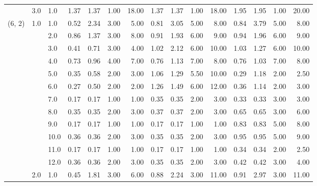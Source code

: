\begin{tabular}{lllrrrrrrrrrrrr}
       & 3.0 & 1.0  &       1.37 &      1.37 & 1.00 &  18.00 &       1.37 &      1.37 &  1.00 &  18.00 &       1.95 &      1.95 &  1.00 &  20.00 \\
(6, 2) & 1.0 & 1.0  &       0.52 &      2.34 & 3.00 &   5.00 &       0.81 &      3.05 &  5.00 &   8.00 &       0.84 &      3.79 &  5.00 &   8.00 \\
       &     & 2.0  &       0.86 &      1.37 & 3.00 &   8.00 &       0.91 &      1.93 &  6.00 &   9.00 &       0.94 &      1.96 &  6.00 &   9.00 \\
       &     & 3.0  &       0.41 &      0.71 & 3.00 &   4.00 &       1.02 &      2.12 &  6.00 &  10.00 &       1.03 &      1.27 &  6.00 &  10.00 \\
       &     & 4.0  &       0.73 &      0.96 & 4.00 &   7.00 &       0.76 &      1.13 &  7.00 &   8.00 &       0.76 &      1.03 &  7.00 &   8.00 \\
       &     & 5.0  &       0.35 &      0.58 & 2.00 &   3.00 &       1.06 &      1.29 &  5.50 &  10.00 &       0.29 &      1.18 &  2.00 &   2.50 \\
       &     & 6.0  &       0.27 &      0.50 & 2.00 &   2.00 &       1.26 &      1.49 &  6.00 &  12.00 &       0.36 &      1.14 &  2.00 &   3.00 \\
       &     & 7.0  &       0.17 &      0.17 & 1.00 &   1.00 &       0.35 &      0.35 &  2.00 &   3.00 &       0.33 &      0.33 &  3.00 &   3.00 \\
       &     & 8.0  &       0.35 &      0.35 & 2.00 &   3.00 &       0.37 &      0.37 &  2.00 &   3.00 &       0.65 &      0.65 &  3.00 &   6.00 \\
       &     & 9.0  &       0.17 &      0.17 & 1.00 &   1.00 &       0.17 &      0.17 &  1.00 &   1.00 &       0.83 &      0.83 &  5.00 &   8.00 \\
       &     & 10.0 &       0.36 &      0.36 & 2.00 &   3.00 &       0.35 &      0.35 &  2.00 &   3.00 &       0.95 &      0.95 &  5.00 &   9.00 \\
       &     & 11.0 &       0.17 &      0.17 & 1.00 &   1.00 &       0.17 &      0.17 &  1.00 &   1.00 &       0.34 &      0.34 &  2.00 &   2.50 \\
       &     & 12.0 &       0.36 &      0.36 & 2.00 &   3.00 &       0.35 &      0.35 &  2.00 &   3.00 &       0.42 &      0.42 &  3.00 &   4.00 \\
       & 2.0 & 1.0  &       0.45 &      1.81 & 3.00 &   6.00 &       0.88 &      2.24 &  3.00 &  11.00 &       0.91 &      2.97 &  3.00 &  11.00 \\

\end{tabular}
